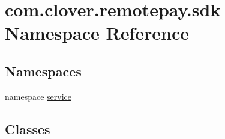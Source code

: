 \hypertarget{namespacecom_1_1clover_1_1remotepay_1_1sdk}{}\section{com.\+clover.\+remotepay.\+sdk Namespace Reference}
\label{namespacecom_1_1clover_1_1remotepay_1_1sdk}
\subsection*{Namespaces}
\begin{DoxyCompactItemize}
\item 
namespace \hyperlink{namespacecom_1_1clover_1_1remotepay_1_1sdk_1_1service}{service}
\end{DoxyCompactItemize}
\subsection*{Classes}
